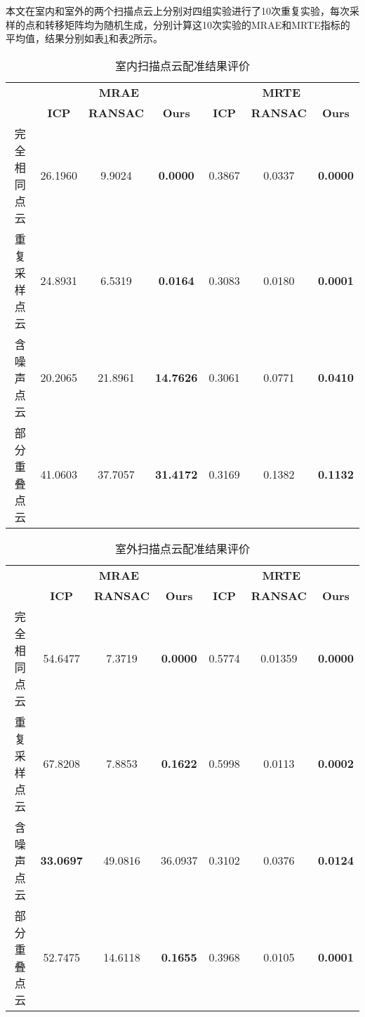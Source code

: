 本文在室内和室外的两个扫描点云上分别对四组实验进行了10次重复实验，每次采样的点和转移矩阵均为随机生成，分别计算这10次实验的MRAE和MRTE指标的平均值，结果分别如表\ref{indoor-evaluate}和表\ref{outdoor-evaluate}所示。

\begin{table}
	\centering
	\caption{室内扫描点云配准结果评价}
	\label{indoor-evaluate}
	\begin{tabular}{ccccccc}
		\toprule
		\textbf{} & \multicolumn{3}{c}{\textbf{MRAE}}                 & \multicolumn{3}{c}{\textbf{MRTE}}                \\
		& \textbf{ICP} & \textbf{RANSAC} & \textbf{Ours}    & \textbf{ICP} & \textbf{RANSAC} & \textbf{Ours}   \\ \midrule
		完全相同点云    & 26.1960      & 9.9024          & \textbf{0.0000}  & 0.3867       & 0.0337          & \textbf{0.0000} \\
		重复采样点云    & 24.8931      & 6.5319          & \textbf{0.0164}  & 0.3083       & 0.0180          & \textbf{0.0001} \\
		含噪声点云     & 20.2065      & 21.8961         & \textbf{14.7626} & 0.3061       & 0.0771          & \textbf{0.0410} \\
		部分重叠点云    & 41.0603      & 37.7057         & \textbf{31.4172} & 0.3169       & 0.1382          & \textbf{0.1132} \\ \bottomrule
	\end{tabular}
\end{table}

\begin{table}
	\centering
	\caption{室外扫描点云配准结果评价}
	\label{outdoor-evaluate}
	\begin{tabular}{ccccccc}
		\toprule
		\textbf{} & \multicolumn{3}{c}{\textbf{MRAE}}                 & \multicolumn{3}{c}{\textbf{MRTE}}                \\
		& \textbf{ICP} & \textbf{RANSAC} & \textbf{Ours}    & \textbf{ICP} & \textbf{RANSAC} & \textbf{Ours}   \\ \midrule
		完全相同点云    & 54.6477          & 7.3719          & \textbf{0.0000} & 0.5774       & 0.01359         & \textbf{0.0000} \\
		重复采样点云    & 67.8208          & 7.8853          & \textbf{0.1622} & 0.5998       & 0.0113          & \textbf{0.0002} \\
		含噪声点云     & \textbf{33.0697} & 49.0816         & 36.0937         & 0.3102       & 0.0376          & \textbf{0.0124} \\
		部分重叠点云    & 52.7475          & 14.6118         & \textbf{0.1655} & 0.3968       & 0.0105          & \textbf{0.0001} \\ \bottomrule
	\end{tabular}
\end{table}

